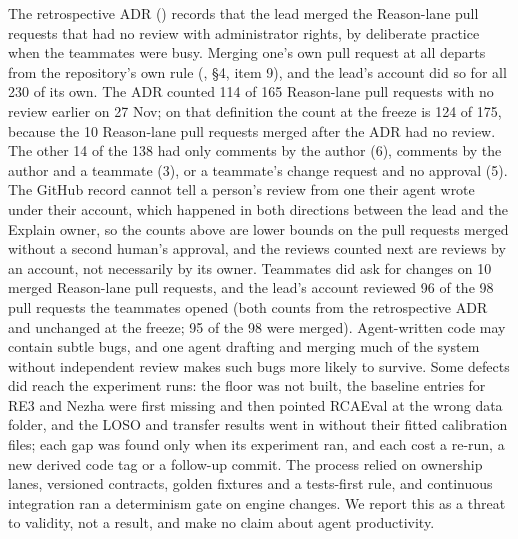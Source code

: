 The retrospective ADR (\allowbreak{}) records that the lead merged the Reason-lane pull requests that had no review with administrator rights, by deliberate practice when the teammates were busy.
Merging one's own pull request at all departs from the repository's own rule (, \S4, item 9), and the lead's account did so for all 230 of its own.
The ADR counted 114 of 165 Reason-lane pull requests with no review earlier on 27 Nov; on that definition the count at the freeze is 124 of 175, because the 10 Reason-lane pull requests merged after the ADR had no review.
The other 14 of the 138 had only comments by the author (6), comments by the author and a teammate (3), or a teammate's change request and no approval (5).
The GitHub record cannot tell a person's review from one their agent wrote under their account, which happened in both directions between the lead and the Explain owner, so the counts above are lower bounds on the pull requests merged without a second human's approval, and the reviews counted next are reviews by an account, not necessarily by its owner.
Teammates did ask for changes on 10 merged Reason-lane pull requests, and the lead's account reviewed 96 of the 98 pull requests the teammates opened (both counts from the retrospective ADR and unchanged at the freeze; 95 of the 98 were merged).
Agent-written code may contain subtle bugs, and one agent drafting and merging much of the system without independent review makes such bugs more likely to survive.
Some defects did reach the experiment runs: the  floor was not built, the baseline entries for RE3 and Nezha were first missing and then pointed RCAEval at the wrong data folder, and the LOSO and transfer results went in without their fitted calibration files; each gap was found only when its experiment ran, and each cost a re-run, a new derived code tag or a follow-up commit.
The process relied on ownership lanes, versioned contracts, golden fixtures and a tests-first rule, and continuous integration ran a determinism gate on engine changes.
We report this as a threat to validity, not a result, and make no claim about agent productivity.
